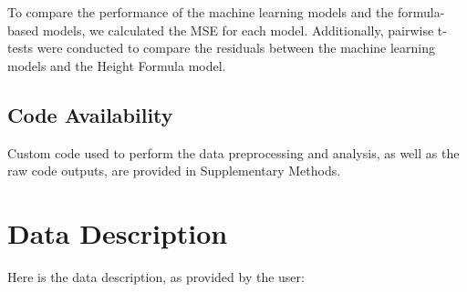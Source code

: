 \documentclass[11pt]{article}
\begin{document}
To compare the performance of the machine learning models and the formula-based models, we calculated the MSE for each model. Additionally, pairwise t-tests were conducted to compare the residuals between the machine learning models and the Height Formula model.\subsection*{Code Availability}

Custom code used to perform the data preprocessing and analysis, as well as the raw code outputs, are provided in Supplementary Methods.


\clearpage
\appendix

\section{Data Description} \label{sec:data_description} Here is the data description, as provided by the user:
\end{document}
